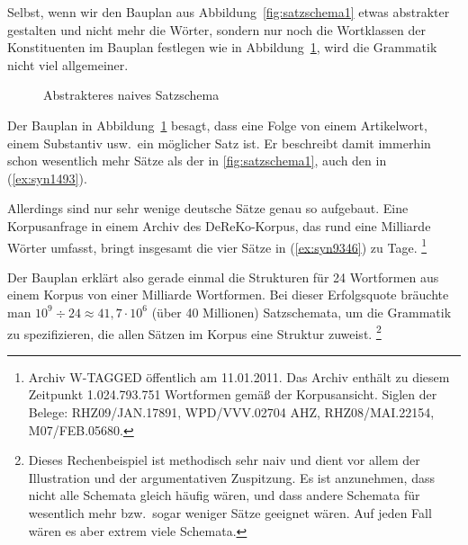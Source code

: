 Selbst, wenn wir den Bauplan aus Abbildung~\ref{fig:satzschema1} etwas abstrakter gestalten und nicht mehr die Wörter, sondern nur noch die Wortklassen der Konstituenten im Bauplan festlegen wie in Abbildung~\ref{fig:satzschema2}, wird die Grammatik nicht viel allgemeiner.

\begin{figure}[!htbp]
  \centering
  \caption{Abstrakteres naives Satzschema}
  \label{fig:satzschema2}
\end{figure}

Der Bauplan in Abbildung~\ref{fig:satzschema2} besagt, dass eine Folge von einem Artikelwort, einem Substantiv usw.\ ein möglicher Satz ist.
Er beschreibt damit immerhin schon wesentlich mehr Sätze als der in \ref{fig:satzschema1}, \zB auch den in (\ref{ex:syn1493}).

\begin{exe}
\end{exe}

Allerdings sind nur sehr wenige deutsche Sätze genau so aufgebaut.
Eine Korpusanfrage in einem Archiv des DeReKo-Korpus, das rund eine Milliarde Wörter umfasst, bringt insgesamt die vier Sätze in (\ref{ex:syn9346}) zu Tage.%
\footnote{Archiv W-TAGGED öffentlich am 11.01.2011.
Das Archiv enthält zu diesem Zeitpunkt 1.024.793.751 Wortformen gemäß der Korpusansicht.
Siglen der Belege: RHZ09/JAN.17891, WPD/VVV.02704 AHZ, RHZ08/MAI.22154, M07/FEB.05680.}

\begin{exe}
  \ex \label{ex:syn9346}
  \begin{xlist}
  \end{xlist}
\end{exe}

Der Bauplan erklärt also gerade einmal die Strukturen für 24 Wortformen aus einem Korpus von einer Milliarde Wortformen.
Bei dieser Erfolgsquote bräuchte man $10^9\div24\approx41,7\cdot10^6$ (über 40 Millionen) Satzschemata, um die Grammatik zu spezifizieren, die allen Sätzen im Korpus eine Struktur zuweist.%
\footnote{Dieses Rechenbeispiel ist methodisch sehr naiv und dient vor allem der Illustration und der argumentativen Zuspitzung.
Es ist \zB anzunehmen, dass nicht alle Schemata gleich häufig wären, und dass andere Schemata für wesentlich mehr bzw.\ sogar weniger Sätze geeignet wären.
Auf jeden Fall wären es aber extrem viele Schemata.}

